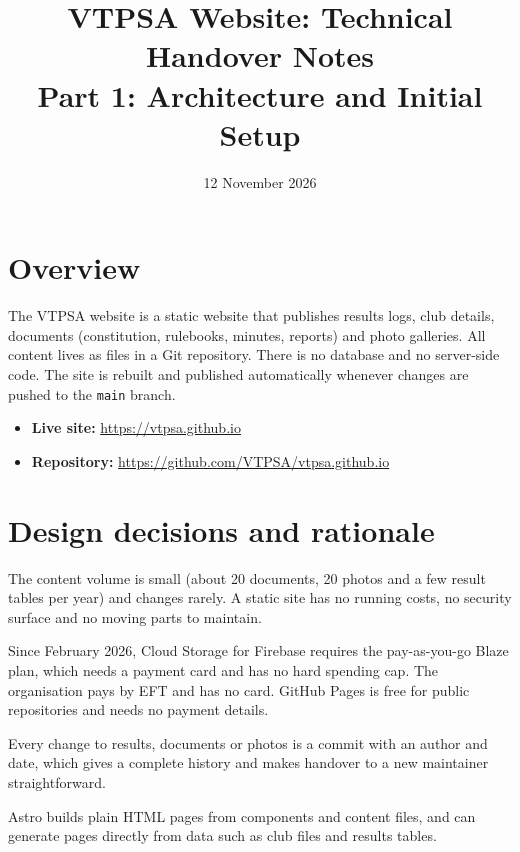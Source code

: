 \documentclass[11pt,a4paper]{article}
\title{VTPSA Website: Technical Handover Notes\\
\large Part 1: Architecture and Initial Setup}
\author{}
\date{12 November 2026}
\begin{document}
\maketitle

\section{Overview}
The VTPSA website is a static website that publishes results logs, club details,
documents (constitution, rulebooks, minutes, reports) and photo galleries.
All content lives as files in a Git repository. There is no database and no
server-side code. The site is rebuilt and published automatically whenever
changes are pushed to the \texttt{main} branch.

\begin{itemize}[nosep]
  \item \textbf{Live site:} \url{https://vtpsa.github.io}
  \item \textbf{Repository:} \url{https://github.com/VTPSA/vtpsa.github.io}
\end{itemize}

\section{Design decisions and rationale}
\begin{description}[leftmargin=0pt, style=nextline]
  \item[Static site instead of a database-backed web application.]
  The content volume is small (about 20 documents, 20 photos and a few result
  tables per year) and changes rarely. A static site has no running costs, no
  security surface and no moving parts to maintain.

  \item[GitHub Pages hosting instead of Firebase.]
  Since February 2026, Cloud Storage for Firebase requires the pay-as-you-go
  Blaze plan, which needs a payment card and has no hard spending cap. The
  organisation pays by EFT and has no card. GitHub Pages is free for public
  repositories and needs no payment details.

  \item[Content stored in Git.]
  Every change to results, documents or photos is a commit with an author and
  date, which gives a complete history and makes handover to a new maintainer
  straightforward.

  \item[Astro as the site generator.]
  Astro builds plain HTML pages from components and content files, and can
  generate pages directly from data such as club files and results tables.
\end{description}
\end{document}
